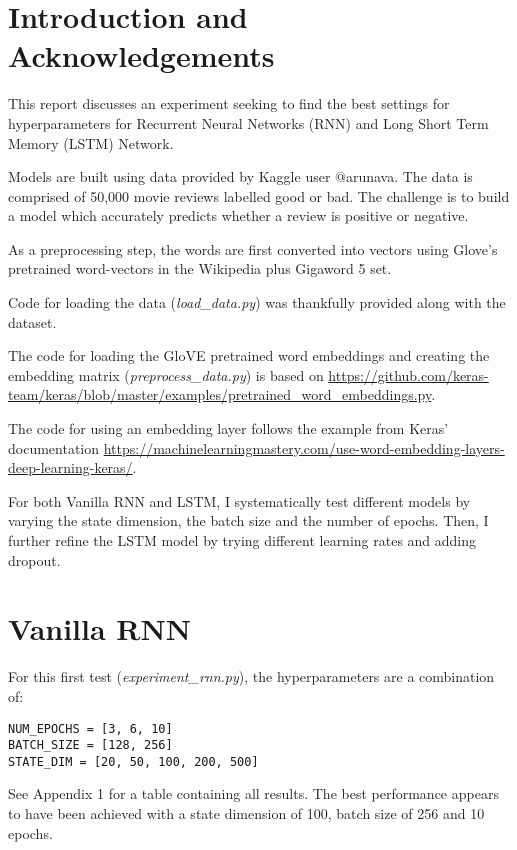 \documentclass[letterpaper, 10pt]{article}
\begin{document}
\section{Introduction and Acknowledgements}

This report discusses an experiment seeking to find the best
settings for hyperparameters for Recurrent Neural Networks (RNN) and Long Short
Term Memory (LSTM) Network.

Models are built using data\cite{maas-EtAl:2011:ACL-HLT2011} provided by
Kaggle user @arunava. The data is comprised of
50,000 movie reviews labelled good or bad. The challenge is to build
a model which accurately predicts whether a review is positive or negative.

As a preprocessing step, the words are first converted into vectors using
Glove's\cite{pennington2014glove} pretrained word-vectors in the Wikipedia plus
Gigaword 5 set.

Code for loading the data ({\em load\_data.py}) was thankfully provided along with the
dataset.

The code for loading the GloVE pretrained word embeddings and creating the embedding
 matrix ({\em preprocess\_data.py}) is based on \url{https://github.com/keras-team/keras/blob/master/examples/pretrained\_word\_embeddings.py}.

The code for using an embedding layer follows the example from Keras' documentation \url{https://machinelearningmastery.com/use-word-embedding-layers-deep-learning-keras/}.

For both Vanilla RNN and LSTM, I systematically test different models by varying the
state dimension, the batch size and the number of epochs. Then, I further refine
the LSTM model by trying different learning rates and adding dropout.

\section{Vanilla RNN}

For this first test ({\em experiment\_rnn.py}), the hyperparameters are a combination
of:

\begin{verbatim}
NUM_EPOCHS = [3, 6, 10]
BATCH_SIZE = [128, 256]
STATE_DIM = [20, 50, 100, 200, 500]
\end{verbatim}

See Appendix 1 for a table containing all results.
The best performance appears to have been achieved with a state dimension of 100,
batch size of 256 and 10 epochs.
\end{document}
